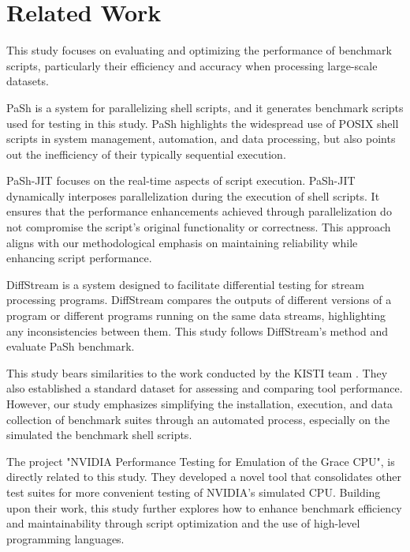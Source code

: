\documentclass[sigplan, screen, 10pt]{acmart}
\begin{document}
\section{Related Work}
\label{related}
This study focuses on evaluating and optimizing the performance of benchmark scripts\cite{binpashbenchmark}, particularly their efficiency and accuracy when processing large-scale datasets.\par

PaSh\cite{vasilakis2021pash} is a system for parallelizing shell scripts, and it generates benchmark scripts used for testing in this study.
PaSh highlights the widespread use of POSIX shell scripts in system management, automation, and data processing, but also points out the inefficiency of their typically sequential execution.\par

PaSh-JIT\cite{mustafa2022parallel} focuses on the real-time aspects of script execution.
PaSh-JIT dynamically interposes parallelization during the execution of shell scripts.
It ensures that the performance enhancements achieved through parallelization do not compromise the script's original functionality or correctness.
This approach aligns with our methodological emphasis on maintaining reliability while enhancing script performance.\par

DiffStream\cite{kallas2020diffstream} is a system designed to facilitate differential testing for stream processing programs.
DiffStream compares the outputs of different versions of a program or different programs running on the same data streams, highlighting any inconsistencies between them.
This study follows DiffStream's method and evaluate PaSh benchmark.\par
This study bears similarities to the work conducted by the KISTI team \cite{kim2015webshark}.   
They also established a standard dataset for assessing and comparing tool performance.
However, our study emphasizes simplifying the installation, execution, and data collection of benchmark suites through an automated process, especially on the simulated the benchmark shell scripts.\par
The project "NVIDIA Performance Testing for Emulation of the Grace CPU"\cite{fan2021nvidia}, is directly related to this study.
They developed a novel tool that consolidates other test suites for more convenient testing of NVIDIA's simulated CPU. 
Building upon their work, this study further explores how to enhance benchmark efficiency and maintainability through script optimization and the use of high-level programming languages.\newline
\end{document}

